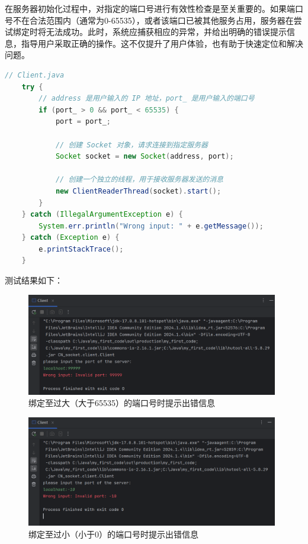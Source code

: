 \documentclass{article}
\begin{document}
	在服务器初始化过程中，对指定的端口号进行有效性检查是至关重要的。如果端口号不在合法范围内（通常为0-65535），或者该端口已被其他服务占用，服务器在尝试绑定时将无法成功。此时，系统应捕获相应的异常，并给出明确的错误提示信息，指导用户采取正确的操作。这不仅提升了用户体验，也有助于快速定位和解决问题。
	
	\begin{lstlisting}[language=Java, title=绑定至错误的端口号时能提示出错信息, tabsize=4]
	// Client.java
	try {
		// address 是用户输入的 IP 地址，port_ 是用户输入的端口号
		if (port_ > 0 && port_ < 65535) {
			port = port_;
			
			// 创建 Socket 对象，请求连接到指定服务器
			Socket socket = new Socket(address, port);
			
			// 创建一个独立的线程，用于接收服务器发送的消息
			new ClientReaderThread(socket).start();
		}
	} catch (IllegalArgumentException e) {
		System.err.println("Wrong input: " + e.getMessage());
	} catch (Exception e) {
		e.printStackTrace();
	}
	\end{lstlisting}
	
	测试结果如下：
	
	\begin{figure}[H]
		\centering
		\includegraphics[width=11cm]{./images/3.绑定至错误的端口号时提示出错信息-1.png}
		\caption{绑定至过大（大于65535）的端口号时提示出错信息}
	\end{figure}
	
	\begin{figure}[H]
		\centering
		\includegraphics[width=11cm]{./images/3.绑定至错误的端口号时提示出错信息-2.png}
		\caption{绑定至过小（小于0）的端口号时提示出错信息}
	\end{figure}
	
\end{document}
